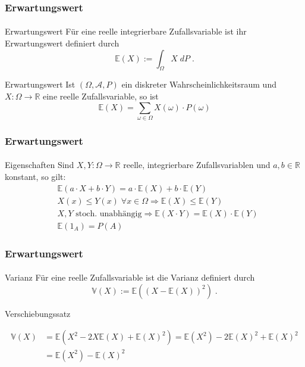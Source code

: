 \documentclass{beamer}
\begin{document}
\begin{frame}
    \frametitle{Erwartungswert}
\framesubtitle{}
\begin{block}{Erwartungswert}
Für eine reelle integrierbare Zufallsvariable ist ihr  Erwartungswert  definiert durch
$$ \mathbb{E} (X) := \int_{\Omega} X \; dP \; .$$
\end{block}
 \begin{block}{Erwartungswert}
Ist $(\Omega, \mathcal{A}, P)$ ein diskreter Wahrscheinlichkeitsraum und $X :\Omega \to \mathbb{R}$ eine reelle Zufallsvariable, so ist
$$ \mathbb{E} (X) = \sum_{\omega \in \Omega}  X(\omega) \cdot P(\omega)$$
\end{block}
 \end{frame}

 \begin{frame}
    \frametitle{Erwartungswert}
\framesubtitle{}
\begin{block}{Eigenschaften}
Sind $X,Y : \Omega \to \mathbb{R}$   reelle, integrierbare  Zufallsvariablen und $a,b \in \mathbb{R}$ konstant, so gilt:
\begin{align*}
& \mathbb{E}(a \cdot X + b \cdot Y) = a \cdot \mathbb{E}(X) + b \cdot \mathbb{E}(Y) \\
& X(x) \leq Y(x) \;  \forall x \in \Omega \Rightarrow \mathbb{E}(X) \leq \mathbb{E}(Y) \\
& X ,Y \text{ stoch. unabhängig} \Rightarrow   \mathbb{E}(X \cdot Y) =  \mathbb{E}(X) \cdot  \mathbb{E}(Y) \\
& \mathbb{E} (1_A) = P (A)
\end{align*}
\end{block}
 \end{frame}

 \begin{frame}
    \frametitle{Erwartungswert}
\framesubtitle{}
\begin{block}{Varianz}
Für eine reelle Zufallsvariable ist die Varianz definiert durch
$$ \mathbb{V} (X) :=  \mathbb{E}( (X - \mathbb{E}(X))^2) \; .$$
\end{block}
\begin{block}{Verschiebungssatz}

\begin{align*}
 \mathbb{V}(X) & = \mathbb{E}(X^2 - 2X \mathbb{E}(X) + \mathbb{E}(X)^2) = \mathbb{E}(X^2) - 2 \mathbb{E}(X)^2 +  \mathbb{E}(X)^2 \\
& =  \mathbb{E}(X^2) -  \mathbb{E}(X)^2 \\
\end{align*}
\end{block}
 \end{frame}
\end{document}
